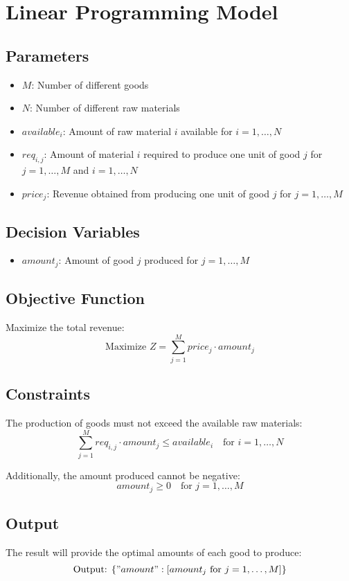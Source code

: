 \documentclass{article}
\begin{document}
\section*{Linear Programming Model}

\subsection*{Parameters}
\begin{itemize}
    \item $M$: Number of different goods
    \item $N$: Number of different raw materials
    \item $available_i$: Amount of raw material $i$ available for $i = 1, \ldots, N$
    \item $req_{i,j}$: Amount of material $i$ required to produce one unit of good $j$ for $j = 1, \ldots, M$ and $i = 1, \ldots, N$
    \item $price_j$: Revenue obtained from producing one unit of good $j$ for $j = 1, \ldots, M$
\end{itemize}

\subsection*{Decision Variables}
\begin{itemize}
    \item $amount_j$: Amount of good $j$ produced for $j = 1, \ldots, M$
\end{itemize}

\subsection*{Objective Function}
Maximize the total revenue:
\[
\text{Maximize } Z = \sum_{j=1}^{M} price_j \cdot amount_j
\]

\subsection*{Constraints}
The production of goods must not exceed the available raw materials:
\[
\sum_{j=1}^{M} req_{i,j} \cdot amount_j \leq available_i \quad \text{for } i = 1, \ldots, N
\]

Additionally, the amount produced cannot be negative:
\[
amount_j \geq 0 \quad \text{for } j = 1, \ldots, M
\]

\subsection*{Output}
The result will provide the optimal amounts of each good to produce:
\[
\text{Output: } \{ "amount": [amount_j \text{ for } j = 1, \ldots, M] \}
\]
\end{document}
